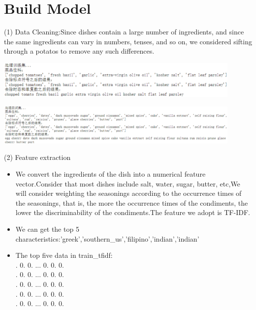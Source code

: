 \section{Build Model}
(1)  Data Cleaning:Since dishes contain a large number of ingredients, and since the same ingredients can vary in numbers, tenses, and so on, we considered sifting through a potatos to remove any such differences.
\begin{center}
  \begin{minipage}{1\linewidth}
    \centering
    \includegraphics[width=0.9\textwidth]{pic01/clean1.eps}
  \end{minipage}
  \begin{minipage}{1\linewidth}
    \centering
    \includegraphics[width=0.9\textwidth]{pic01/clean2.eps}
  \end{minipage}
  
  \hfill
\end{center}
(2) Feature extraction
\begin{itemize}
\item We convert the ingredients of the dish into a numerical feature vector.Consider that most dishes include salt, water, sugar, butter, etc,We will consider weighting the seasonings according to the occurrence times of the seasonings, that is, the more the occurrence times of the condiments, the lower the discriminability of the condiments.The feature we adopt is TF-IDF.
\item We can get the top 5 characteristics:\lbrack'greek','southern\_us','filipino','indian','indian'\rbrack
\item The top five data in train\_tfidf:\\
\lbrack{}. 0. 0. ... 0. 0. 0.\rbrack\\
. 0. 0. ... 0. 0. 0.\rbrack\\
. 0. 0. ... 0. 0. 0.\rbrack\\
. 0. 0. ... 0. 0. 0.\rbrack\\
. 0. 0. ... 0. 0. 0.\rbrack\rbrack
\end{itemize} 


